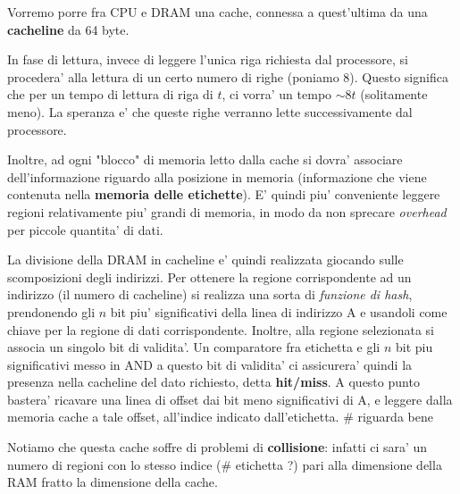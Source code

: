 \documentclass[a4paper,11pt]{article}
\begin{document}
Vorremo porre fra CPU e DRAM una cache, connessa a quest'ultima da una \textbf{cacheline} da 64 byte.

In fase di lettura, invece di leggere l'unica riga richiesta dal processore, si procedera' alla lettura di un certo numero di righe (poniamo 8).
Questo significa che per un tempo di lettura di riga di $t$, ci vorra' un tempo $\sim 8t$ (solitamente meno).
La speranza e' che queste righe verranno lette successivamente dal processore.

Inoltre, ad ogni "blocco" di memoria letto dalla cache si dovra' associare dell'informazione riguardo alla posizione in memoria (informazione che viene contenuta nella \textbf{memoria delle etichette}).
E' quindi piu' conveniente leggere regioni relativamente piu' grandi di memoria, in modo da non sprecare \textit{overhead} per piccole quantita' di dati.

La divisione della DRAM in cacheline e' quindi realizzata giocando sulle scomposizioni degli indirizzi.
Per ottenere la regione corrispondente ad un indirizzo (il numero di cacheline) si realizza una sorta di \textit{funzione di hash}, prendonendo gli $n$ bit piu' significativi della linea di indirizzo A e usandoli come chiave per la regione di dati corrispondente.
Inoltre, alla regione selezionata si associa un singolo bit di validita'.
Un comparatore fra etichetta e gli $n$ bit piu significativi messo in AND a questo bit di validita' ci assicurera' quindi la presenza nella cacheline del dato richiesto, detta \textbf{hit/miss}.
A questo punto bastera' ricavare una linea di offset dai bit meno significativi di A, e leggere dalla memoria cache a tale offset, all'indice indicato dall'etichetta. # riguarda bene

Notiamo che questa cache soffre di problemi di \textbf{collisione}: infatti ci sara' un numero di regioni con lo stesso indice (# etichetta ?) pari alla dimensione della RAM fratto la dimensione della cache.
\end{document}
